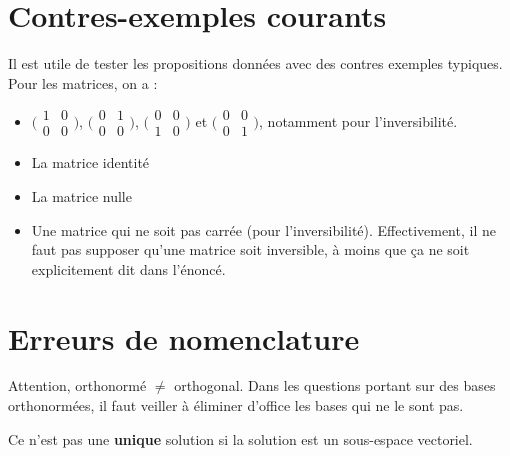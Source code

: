 \documentclass[10pt,a4paper]{book}
\begin{document}
\section{Contres-exemples courants}
Il est utile de tester les propositions données avec des contres exemples typiques. Pour les matrices, on a :
\begin{itemize}
\item $\big(\begin{smallmatrix} 
1 & 0\\
0 & 0
\end{smallmatrix}\big)$, 
$\big(\begin{smallmatrix} 
0 & 1\\
0 & 0
\end{smallmatrix}\big)$, 
$\big(\begin{smallmatrix} 
0 & 0\\
1 & 0
\end{smallmatrix}\big)$ et  
$\big(\begin{smallmatrix} 
0 & 0\\
0 & 1
\end{smallmatrix}\big)$, notamment pour l'inversibilité.
\item La matrice identité
\item La matrice nulle
\item Une matrice qui ne soit pas carrée (pour l'inversibilité). Effectivement, il ne faut pas supposer qu'une matrice soit inversible, à moins que ça ne soit explicitement dit dans l'énoncé.
\end{itemize}

\section{Erreurs de nomenclature}
Attention, orthonormé $\neq$ orthogonal. Dans les questions portant sur des bases orthonormées, il faut veiller à éliminer d'office les bases qui ne le sont pas.\par 
Ce n'est pas une \textbf{unique} solution si la solution est un sous-espace vectoriel.
\end{document}
